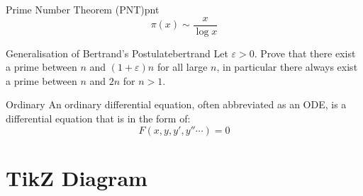 \documentclass{report}
\theoremstyle{definition}
\begin{document}
\begin{Theorem}{Prime Number Theorem (PNT)}{pnt}
  \begin{equation*}
    \pi(x)\sim\frac{x}{\log x}
  \end{equation*}
\end{Theorem}
\begin{Example}{Generalisation of Bertrand's Postulate}{bertrand}
  Let $\varepsilon>0$. Prove that there exist a prime between $n$ and
  $(1+\varepsilon)n$ for all large $n$, in particular there always exist a
  prime between $n$ and $2n$ for $n>1$.
\end{Example}
\begin{Definition}{Ordinary}
  An ordinary differential equation, often abbreviated as an ODE, is a
  differential equation that is in the form of:
  \begin{equation*}
    F(x,y,y',y''\cdots)=0
  \end{equation*}
\end{Definition}

\chapter{TikZ Diagram}

\tikzset{
  box/.style ={
    rectangle, %
    rounded corners =5pt, %
    minimum width =50pt, %
    minimum height =20pt, %
    inner sep=5pt, %
    draw=blue %
  }
}


\end{document}
